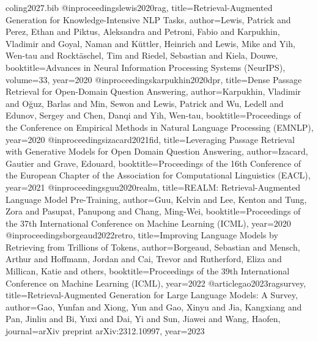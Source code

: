 \documentclass[11pt]{article}
\theoremstyle{remark}
\begin{document}
\begin{filecontents}{coling2027.bib}
@inproceedings{lewis2020rag,
  title={Retrieval-Augmented Generation for Knowledge-Intensive {NLP} Tasks},
  author={Lewis, Patrick and Perez, Ethan and Piktus, Aleksandra and Petroni, Fabio and
          Karpukhin, Vladimir and Goyal, Naman and K{\"u}ttler, Heinrich and Lewis, Mike and
          Yih, Wen-tau and Rockt{\"a}schel, Tim and Riedel, Sebastian and Kiela, Douwe},
  booktitle={Advances in Neural Information Processing Systems (NeurIPS)}, volume={33}, year={2020}
}
@inproceedings{karpukhin2020dpr,
  title={Dense Passage Retrieval for Open-Domain Question Answering},
  author={Karpukhin, Vladimir and O{\u{g}}uz, Barlas and Min, Sewon and Lewis, Patrick and
          Wu, Ledell and Edunov, Sergey and Chen, Danqi and Yih, Wen-tau},
  booktitle={Proceedings of the Conference on Empirical Methods in Natural Language Processing (EMNLP)},
  year={2020}
}
@inproceedings{izacard2021fid,
  title={Leveraging Passage Retrieval with Generative Models for Open Domain Question Answering},
  author={Izacard, Gautier and Grave, Edouard},
  booktitle={Proceedings of the 16th Conference of the European Chapter of the Association for
             Computational Linguistics (EACL)}, year={2021}
}
@inproceedings{guu2020realm,
  title={{REALM}: Retrieval-Augmented Language Model Pre-Training},
  author={Guu, Kelvin and Lee, Kenton and Tung, Zora and Pasupat, Panupong and Chang, Ming-Wei},
  booktitle={Proceedings of the 37th International Conference on Machine Learning (ICML)}, year={2020}
}
@inproceedings{borgeaud2022retro,
  title={Improving Language Models by Retrieving from Trillions of Tokens},
  author={Borgeaud, Sebastian and Mensch, Arthur and Hoffmann, Jordan and Cai, Trevor and
          Rutherford, Eliza and Millican, Katie and others},
  booktitle={Proceedings of the 39th International Conference on Machine Learning (ICML)}, year={2022}
}
@article{gao2023ragsurvey,
  title={Retrieval-Augmented Generation for Large Language Models: A Survey},
  author={Gao, Yunfan and Xiong, Yun and Gao, Xinyu and Jia, Kangxiang and Pan, Jinliu and
          Bi, Yuxi and Dai, Yi and Sun, Jiawei and Wang, Haofen},
  journal={arXiv preprint arXiv:2312.10997}, year={2023}
}


\end{filecontents}
\end{document}
